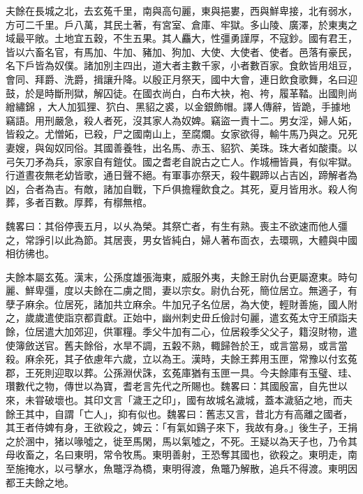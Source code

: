 
\begin{pinyinscope}
夫餘在長城之北，去玄菟千里，南與高句麗，東與挹婁，西與鮮卑接，北有弱水，方可二千里。戶八萬，其民土著，有宮室、倉庫、牢獄。多山陵、廣澤，於東夷之域最平敞。土地宜五穀，不生五果。其人麤大，性彊勇謹厚，不寇鈔。國有君王，皆以六畜名官，有馬加、牛加、豬加、狗加、大使、大使者、使者。邑落有豪民，名下戶皆為奴僕。諸加別主四出，道大者主數千家，小者數百家。食飲皆用俎豆，會同、拜爵、洗爵，揖讓升降。以殷正月祭天，國中大會，連日飲食歌舞，名曰迎鼓，於是時斷刑獄，解囚徒。在國衣尚白，白布大袂，袍、袴，履革鞜。出國則尚繒繡錦𦋺，大人加狐狸、狖白、黑貂之裘，以金銀飾帽。譯人傳辭，皆跪，手據地竊語。用刑嚴急，殺人者死，沒其家人為奴婢。竊盜一責十二。男女淫，婦人妬，皆殺之。尤憎妬，已殺，尸之國南山上，至腐爛。女家欲得，輸牛馬乃與之。兄死妻嫂，與匈奴同俗。其國善養牲，出名馬、赤玉、貂狖、美珠。珠大者如酸棗。以弓矢刀矛為兵，家家自有鎧仗。國之耆老自說古之亡人。作城柵皆員，有似牢獄。行道晝夜無老幼皆歌，通日聲不絕。有軍事亦祭天，殺牛觀蹄以占吉凶，蹄解者為凶，合者為吉。有敵，諸加自戰，下戶俱擔糧飲食之。其死，夏月皆用氷。殺人徇葬，多者百數。厚葬，有槨無棺。

魏畧曰：其俗停喪五月，以乆為榮。其祭亡者，有生有熟。喪主不欲速而他人彊之，常諍引以此為節。其居喪，男女皆純白，婦人著布靣衣，去環珮，大體與中國相彷彿也。

夫餘本屬玄菟。漢末，公孫度雄張海東，威服外夷，夫餘王尉仇台更屬遼東。時句麗、鮮卑彊，度以夫餘在二虜之間，妻以宗女。尉仇台死，簡位居立。無適子，有孽子麻余。位居死，諸加共立麻余。牛加兄子名位居，為大使，輕財善施，國人附之，歲歲遣使詣京都貢獻。正始中，幽州刺史毌丘儉討句麗，遣玄菟太守王頎詣夫餘，位居遣大加郊迎，供軍糧。季父牛加有二心，位居殺季父父子，籍沒財物，遣使簿斂送官。舊夫餘俗，水旱不調，五糓不熟，輙歸咎於王，或言當易，或言當殺。麻余死，其子依慮年六歲，立以為王。漢時，夫餘王葬用玉匣，常豫以付玄菟郡，王死則迎取以葬。公孫淵伏誅，玄菟庫猶有玉匣一具。今夫餘庫有玉璧、珪、瓚數代之物，傳世以為寶，耆老言先代之所賜也。魏畧曰：其國殷富，自先世以來，未甞破壞也。其印文言「濊王之印」，國有故城名濊城，蓋本濊貊之地，而夫餘王其中，自謂「亡人」，抑有似也。魏畧曰：舊志又言，昔北方有高離之國者，其王者侍婢有身，王欲殺之，婢云：「有氣如鷄子來下，我故有身。」後生子，王捐之於溷中，猪以喙噓之，徙至馬閑，馬以氣噓之，不死。王疑以為天子也，乃令其母收畜之，名曰東明，常令牧馬。東明善射，王恐奪其國也，欲殺之。東明走，南至施掩水，以弓擊水，魚鼈浮為橋，東明得渡，魚鼈乃解散，追兵不得渡。東明因都王夫餘之地。


\end{pinyinscope}